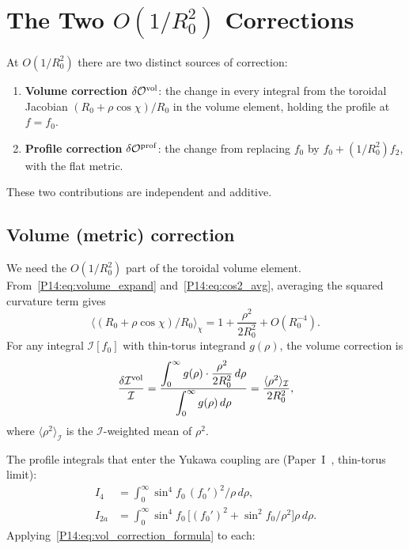 \documentclass[11pt,a4paper]{article}
\theoremstyle{definition}
\theoremstyle{remark}
\newcommand{\fzero}{f_0}
\newcommand{\ftwo}{f_2}
\newcommand{\Rzero}{R_0}
\begin{document}
\section{The Two $O(1/\Rzero^2)$ Corrections}
\label{P14:sec:correction}

At $O(1/\Rzero^2)$ there are two distinct sources of correction:
\begin{enumerate}[label=(\alph*),noitemsep]
\item \textbf{Volume correction} $\delta\mathcal{O}^{\rm vol}$:
  the change in every integral from the toroidal Jacobian
  $(\Rzero+\rho\cos\chi)/\Rzero$ in the volume element,
  holding the profile at $f=\fzero$.
\item \textbf{Profile correction} $\delta\mathcal{O}^{\rm prof}$:
  the change from replacing $\fzero$ by $\fzero+(1/\Rzero^2)\ftwo$,
  with the flat metric.
\end{enumerate}
These two contributions are independent and additive.

\subsection{Volume (metric) correction}

We need the $O(1/\Rzero^2)$ part of the toroidal volume element.
From~\eqref{P14:eq:volume_expand} and~\eqref{P14:eq:cos2_avg},
averaging the squared curvature term gives
\begin{equation}
  \bigl\langle(\Rzero+\rho\cos\chi)/\Rzero\bigr\rangle_\chi
  = 1 + \frac{\rho^2}{2\Rzero^2} + O(\Rzero^{-4}).
  \label{P14:eq:vol_factor}
\end{equation}
For any integral $\mathcal{I}[f_0]$ with thin-torus integrand $g(\rho)$,
the volume correction is
\begin{equation}
  \frac{\delta\mathcal{I}^{\rm vol}}{\mathcal{I}}
  = \frac{\displaystyle\int_0^\infty g(\rho)\cdot\frac{\rho^2}{2\Rzero^2}\,d\rho}
         {\displaystyle\int_0^\infty g(\rho)\,d\rho}
  = \frac{\langle\rho^2\rangle_{\mathcal{I}}}{2\Rzero^2},
  \label{P14:eq:vol_correction_formula}
\end{equation}
where $\langle\rho^2\rangle_{\mathcal{I}}$ is the $\mathcal{I}$-weighted mean of $\rho^2$.

The profile integrals that enter the Yukawa coupling are
(Paper~I~\cite{Paper1}, thin-torus limit):
\begin{align}
  I_4    &= \int_0^\infty \sin^4\!\fzero\,(\fzero')^2/\rho\,d\rho,
  \label{P14:eq:I4_def}\\
  I_{2a} &= \int_0^\infty \sin^4\!\fzero\,
            \bigl[(\fzero')^2 + \sin^2\!\fzero/\rho^2\bigr]\rho\,d\rho.
  \label{P14:eq:I2a_def}
\end{align}
Applying~\eqref{P14:eq:vol_correction_formula} to each:
\end{document}
